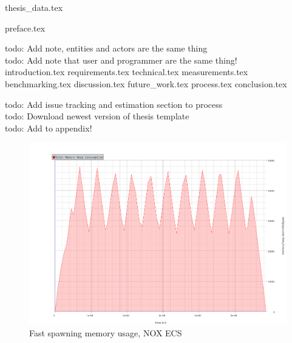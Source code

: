 \documentclass[BSP,english,oneside]{ntnuthesis/ntnubachelorthesis}
\newcommand{\todo}[1]{{\color{cyan}\lbrack todo: #1\rbrack}\\} %
\begin{document}
{thesis_data.tex}

\makefrontpages

{preface.tex}

\tableofcontents
\listoffigures
\listoftables

\todo{Add note, entities and actors are the same thing}
\todo{Add note that user and programmer are the same thing!}

{introduction.tex}
{requirements.tex}
{technical.tex}
{measurements.tex}
{benchmarking.tex}
{discussion.tex}
{future_work.tex}
{process.tex}
{conclusion.tex}




\todo{Add issue tracking and estimation section to process}
\todo{Download newest version of thesis template}


\appendix %
\todo{Add to appendix!}
\begin{figure}
    \includegraphics[scale=0.5]{benchmark_results/fast_spawn/ecs_massif_deletes_10.pdf}
    \caption{Fast spawning memory usage, NOX ECS}
    \label{fig:fast_spawning_memory_usage_nox_ecs}
\end{figure}
\end{document}
